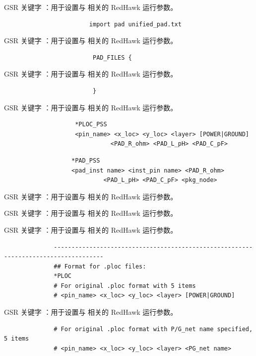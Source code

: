 GSR 关键字 ：用于设置与  相关的 RedHawk 运行参数。

\begin{lstlisting}
                        import pad unified_pad.txt
\end{lstlisting}

GSR 关键字 ：用于设置与  相关的 RedHawk 运行参数。

\begin{lstlisting}
                         PAD_FILES {
\end{lstlisting}

GSR 关键字 ：用于设置与  相关的 RedHawk 运行参数。

\begin{lstlisting}
                         }
\end{lstlisting}

GSR 关键字 ：用于设置与  相关的 RedHawk 运行参数。

\begin{lstlisting}
                    *PLOC_PSS
                    <pin_name> <x_loc> <y_loc> <layer> [POWER|GROUND]
                              <PAD_R_ohm> <PAD_L_pH> <PAD_C_pF>
\end{lstlisting}

\begin{lstlisting}
                   *PAD_PSS
                   <pad_inst name> <inst_pin name> <PAD_R_ohm>
                            <PAD_L_pH> <PAD_C_pF> <pkg_node>
\end{lstlisting}

GSR 关键字 ：用于设置与  相关的 RedHawk 运行参数。

GSR 关键字 ：用于设置与  相关的 RedHawk 运行参数。

GSR 关键字 ：用于设置与  相关的 RedHawk 运行参数。

\begin{lstlisting}
              ------------------------------------------------------------------------------------
              ## Format for .ploc files:
              *PLOC
              # For original .ploc format with 5 items
              # <pin_name> <x_loc> <y_loc> <layer> [POWER|GROUND]
\end{lstlisting}

GSR 关键字 ：用于设置与  相关的 RedHawk 运行参数。

\begin{lstlisting}
              # For original .ploc format with P/G_net name specified, 5 items
              # <pin_name> <x_loc> <y_loc> <layer> <PG_net name>
\end{lstlisting}

